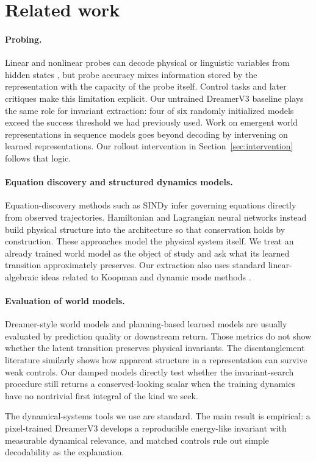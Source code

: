 \section{Related work}
\label{sec:related}

\paragraph{Probing.} Linear and nonlinear probes can decode physical or linguistic variables from
hidden states \citep{alain2017probing}, but probe accuracy mixes information stored by the
representation with the capacity of the probe itself. Control tasks \citep{hewitt2019control} and
later critiques \citep{belinkov2022probing} make this limitation explicit. Our untrained DreamerV3
baseline plays the same role for invariant extraction: four of six randomly initialized models exceed
the success threshold we had previously used. Work on emergent world representations in sequence
models \citep{li2023othello,nanda2023othello} goes beyond decoding by intervening on learned
representations. Our rollout intervention in Section~\ref{sec:intervention} follows that logic.

\paragraph{Equation discovery and structured dynamics models.} Equation-discovery methods such as
SINDy \citep{brunton2016sindy} infer governing equations directly from observed trajectories.
Hamiltonian and Lagrangian neural networks \citep{greydanus2019hnn,cranmer2020lnn} instead build
physical structure into the architecture so that conservation holds by construction. These approaches
model the physical system itself. We treat an already trained world model as the object of study and
ask what its learned transition approximately preserves. Our extraction also uses standard
linear-algebraic ideas related to Koopman and dynamic mode methods \citep{schmid2010dmd}.

\paragraph{Evaluation of world models.} Dreamer-style world models
\citep{hafner2023dreamerv3,ha2018world} and planning-based learned models
\citep{schrittwieser2020muzero} are usually evaluated by prediction quality or downstream return.
Those metrics do not show whether the latent transition preserves physical invariants. The
disentanglement literature \citep{locatello2019challenging} similarly shows how apparent structure in
a representation can survive weak controls. Our damped models directly test whether the
invariant-search procedure still returns a conserved-looking scalar when the training dynamics have
no nontrivial first integral of the kind we seek.

The dynamical-systems tools we use are standard. The main result is empirical: a pixel-trained
DreamerV3 develops a reproducible energy-like invariant with measurable dynamical relevance, and
matched controls rule out simple decodability as the explanation.
